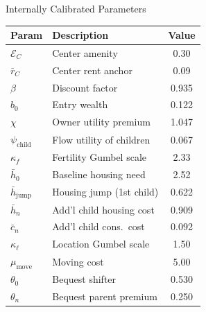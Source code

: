 \documentclass[11pt,aspectratio=169]{beamer}
\begin{document}
\begin{frame}{Internally Calibrated Parameters \; \hyperlink{app:calibration_strategy}{}}
\footnotesize
\renewcommand{\arraystretch}{0.85}
\centering
\begin{tabular}{llc}
\toprule
\textbf{Param} & \textbf{Description} & \textbf{Value} \\
\midrule
$\mathcal{E}_C$ & Center amenity & 0.30 \\
$\bar r_C$ & Center rent anchor & 0.09 \\
$\beta$ & Discount factor & 0.935 \\
$b_0$ & Entry wealth & 0.122 \\
$\chi$ & Owner utility premium & 1.047 \\
$\psi_{\text{child}}$ & Flow utility of children & 0.067 \\
$\kappa_f$ & Fertility Gumbel scale & 2.33 \\
$\bar h_0$ & Baseline housing need & 2.52 \\
$\bar h_{\text{jump}}$ & Housing jump (1st child) & 0.622 \\
$\bar h_n$ & Add'l child housing cost & 0.909 \\
$\bar c_n$ & Add'l child cons.\ cost & 0.092 \\
$\kappa_\ell$ & Location Gumbel scale & 1.50 \\
$\mu_{\text{move}}$ & Moving cost & 5.00 \\
$\theta_0$ & Bequest shifter & 0.530 \\
$\theta_n$ & Bequest parent premium & 0.250 \\
\bottomrule
\end{tabular}
\end{frame}
\end{document}

